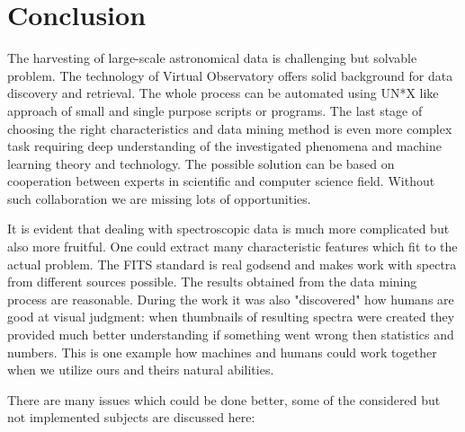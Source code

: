 \chapter{Conclusion}

The harvesting of large-scale astronomical data is challenging but
solvable problem. The technology of Virtual Observatory offers solid
background for data discovery and retrieval. The whole process can be
automated using UN*X like approach of small and single purpose scripts
or programs. The last stage of choosing the right characteristics and
data mining method is even more complex task requiring deep
understanding of the investigated phenomena and machine learning
theory and technology. The possible solution can be based on
cooperation between experts in scientific and computer science
field. Without such collaboration we are missing lots of
opportunities.

It is evident that dealing with spectroscopic data is much more
complicated but also more fruitful. One could extract many
characteristic features which fit to the actual problem. The FITS
standard is real godsend and makes work with spectra from different
sources possible. The results obtained from the data mining process
are reasonable. During the work it was also "discovered" how humans
are good at visual judgment: when thumbnails of resulting spectra were
created they provided much better understanding if something went
wrong then statistics and numbers. This is one example how machines
and humans could work together when we utilize ours and theirs natural
abilities.

There are many issues which could be done better, some of the
considered but not implemented subjects are discussed here:


